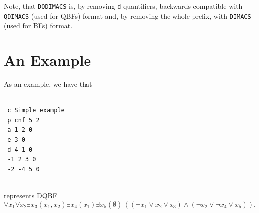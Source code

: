 \documentclass[
  digital, %
  color,
  twoside, %
  table,   %
  nolof,     %
  nolot,     %
]{fithesis3}
\theoremstyle{definition}
\theoremstyle{remark}
\newcommand{\itholds}{\,}
\newcommand{\DQDIMACS}[0]{\texttt{DQDIMACS}}
\begin{document}
Note, that \DQDIMACS{} is, by removing \verb|d| quantifiers, backwards compatible with \texttt{QDIMACS} (used for QBFs) format and, by removing the whole prefix, with \texttt{DIMACS} (used for BFs) format.

\section{An Example}
As an example, we have that
\begin{verbatim}

 c Simple example
 p cnf 5 2
 a 1 2 0
 e 3 0
 d 4 1 0
 -1 2 3 0
 -2 -4 5 0
 
\end{verbatim}
represents DQBF
\[\forall x_1 \forall  x_2 \exists x_3 (x_1, x_2) \exists x_4(x_1) \exists x_5(\emptyset) \itholds ((\neg x_1 \lor x_2 \lor x_3) \land (\neg x_2 \lor \neg x_4 \lor x_5)).\]
\end{document}
